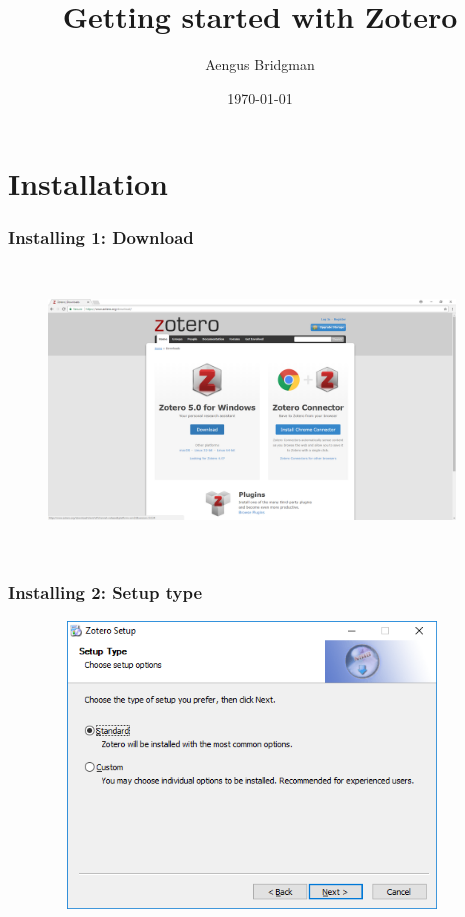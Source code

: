 \documentclass[12pt]{beamer}
\title{Getting started with Zotero}
\date{\today}
\author{Aengus Bridgman}
\institute{CSDC Winter School}
\begin{document}
\maketitle

\section{Installation}

\begin{frame} \frametitle{Installing 1: Download} \begin{figure}[!h] \centering
	\includegraphics[height=3in, width = 4.25in,keepaspectratio]{zotero/install_1.png}
\end{figure} \end{frame}

\begin{frame} \frametitle{Installing 2: Setup type} \begin{figure}[!h] \centering
	\includegraphics[height=3in, width = 4.25in,keepaspectratio]{zotero/install_2.png}
\end{figure} \end{frame}
\end{document}
